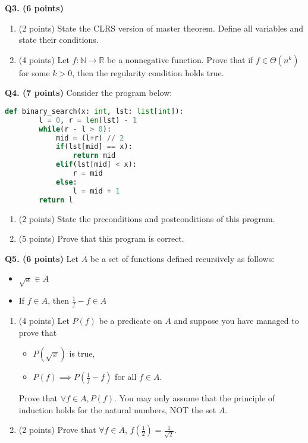 \documentclass{article}
\begin{document}
    \pagebreak

    \noindent\textbf{Q3. (6 points)}
    \begin{enumerate}[label=\alph*)]
        \item (2 points) State the CLRS version of master theorem. Define all variables and state their conditions.
        \vfill
        \item (4 points) Let \(f: \mathbb{N} \to \mathbb{R}\) be a nonnegative function. Prove that if \(f \in \Theta (n^k)\) for some \(k > 0\), then the regularity condition holds true.
        \vfill
    \end{enumerate}

    \pagebreak

    \noindent\textbf{Q4. (7 points)} Consider the program below:
    \begin{lstlisting}[language=Python]
    def binary_search(x: int, lst: list[int]):
        l = 0, r = len(lst) - 1
        while(r - l > 0):
            mid = (l+r) // 2
            if(lst[mid] == x):
                return mid
            elif(lst[mid] < x):
                r = mid
            else:
                l = mid + 1
        return l
    \end{lstlisting}
    \begin{enumerate}[label=\alph*)]
        \item (2 points) State the preconditions and postconditions of this program.
        \bigskip
        \item (5 points) Prove that this program is correct.
    \end{enumerate}
    
    \pagebreak

    \noindent\textbf{Q5. (6 points)} Let \(A\) be a set of functions defined recursively as follows:
    \begin{itemize}
        \item \(\sqrt{x} \in A\) 
        \item If \(f \in A\), then \(\frac{1}{f} - f \in A\) 
    \end{itemize}
    
    \begin{enumerate}[label=\alph*)]
        \item (4 points) Let \(P(f)\) be a predicate on \(A\) and suppose you have managed to prove that
        \begin{itemize}
            \item \(P(\sqrt{x})\) is true,
            \item \(P(f) \implies P(\frac{1}{f} - f)\) for all \(f \in A\).
        \end{itemize}
        Prove that \(\forall f \in A, P(f)\). You may only assume that the principle of induction holds for the natural numbers, NOT the set \(A\).
        \vfill
        \item (2 points) Prove that \(\forall f \in A\), \(f \left( \frac{1}{2} \right) = \frac{1}{\sqrt{2}}\).
        \vfill
    \end{enumerate}
\end{document}
